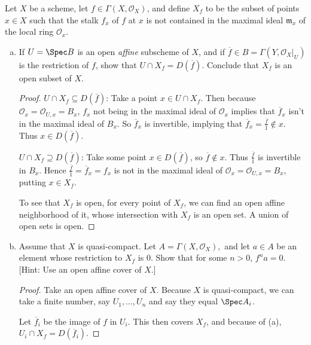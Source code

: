 \begin{exercise}%
Let $X $ be a scheme, let $f\in \Gamma(X,\mathcal{O}_X)$, and define $X_f $ to be the subset of points $x\in X $ such that the stalk $f_x $ of $f $ at $x $ is not contained in the maximal ideal $\mathfrak{m}_x$ of the local ring $\mathcal{O}_x $.
\begin{enumerate}[(a)]
	\item If $U = \Spec B$ is an open \textit{affine} subscheme of $X $, and if $\overline{f} \in B = \Gamma(Y,\mathcal{O}_X|_U)  $ is the restriction of $f $, show that $U\cap X_f = D(\overline{f})  $. Conclude that $X_f $ is an open subset of $X $.
	\begin{proof}
		$U\cap X_f \subseteq D(\overline{f})  $: Take a point $x\in U\cap X_f $.
		Then because $\mathcal{O}_x = \mathcal{O}_{U,x} = B_x $, $f_x $ not being in the maximal ideal of $\mathcal{O}_x$ implies that $\overline{f}_x  $ isn't in the maximal ideal of $B_x $.
		So $\overline{f}_x  $ is invertible, implying that $\overline{f}_x = \frac{\overline{f}}{1}  \notin x  $.
		Thus $x\in D(\overline{f})  $.

		$U\cap X_f \supseteq D(\overline{f})  $:
		Take some point $x\in D(\overline{f})  $, so $\overline{f}\not\in x$.
		Thus $\frac{\overline{f}}{1}$ is invertible in $B_x $.
		Hence $\frac{\overline{f} }{1} = \overline{f}_x = f_x$ is not in the maximal ideal of $\mathcal{O}_x = \mathcal{O}_{U,x} = B_x $, putting $x \in X_f $.

		To see that $X_f $ is open, for every point of $X_f $, we can find an open affine neighborhood of it, whose intersection with $X_f $ is an open set.
		A union of open sets is open.
	\end{proof}
	\item Assume that $X $ is quasi-compact. Let $A = \Gamma(X,\mathcal{O}_X), $ and let $a\in A $ be an element whose restriction to $X_f $ is $0 $. Show that for some $n > 0 $, $f^na = 0 $.
		[Hint: Use an open affine cover of $X $.]
	\begin{proof}
		Take an open affine cover of $X $.
		Because $X $ is quasi-compact, we can take a finite number, say $U_{1}, \ldots ,U_n $ and say they equal $\Spec A_i $.

		Let $\overline{f}_i  $ be the image of $f $ in $U_i $.
		This then covers $X_f $, and because of (a), $U_i \cap X_f = D(\overline{f}_i)  $.


\end{proof}
\end{enumerate}
\end{exercise}
